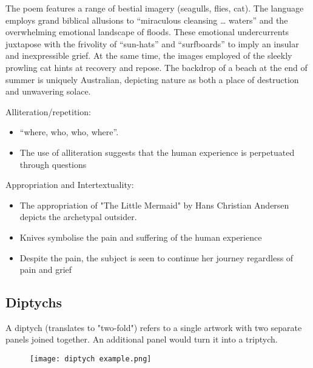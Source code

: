 			\subitem The poem features a range of bestial imagery (seagulls, flies, cat). The language employs grand biblical allusions to “miraculous cleansing … waters” and the overwhelming emotional landscape of floods. These emotional undercurrents juxtapose with the frivolity of “sun-hats” and “surfboards” to imply an insular and inexpressible grief. At the same time, the images employed of the sleekly prowling cat hints at recovery and repose. The backdrop of a beach at the end of summer is uniquely Australian, depicting nature as both a place of destruction and unwavering solace.

		Alliteration/repetition:
		\begin{itemize}
			\item “where, who, who, where”.
			\item The use of alliteration suggests that the human experience is perpetuated through questions
		\end{itemize}
		
		Appropriation and Intertextuality:
		\begin{itemize}
			\item The appropriation of "The Little Mermaid" by Hans Christian Andersen depicts the archetypal outsider.
			\item Knives symbolise the pain and suffering of the human experience
			\item Despite the pain, the subject is seen to continue her journey regardless of pain and grief
		\end{itemize}
	
	\subsection{Diptychs}
		A diptych (translates to "two-fold") refers to a single artwork with two separate panels joined together. An additional panel would turn it into a triptych.
		\begin{figure}[H]
			\centering
			\texttt{[image: diptych example.png]}
		\end{figure}
		